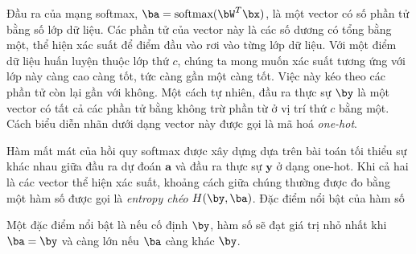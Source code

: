 \def\softmax{\text{softmax}}
Đầu ra của mạng softmax, $\ba = \softmax(\bW^T\bx)$, là một vector có số phần tử bằng số lớp dữ liệu. Các phần tử của vector này là các số dương có tổng bằng một, thể hiện xác suất để điểm đầu vào rơi vào từng lớp dữ liệu. Với một điểm dữ liệu huấn luyện thuộc lớp thứ $c$, chúng ta mong muốn xác suất tương ứng với lớp này càng cao càng tốt, tức càng gần một càng tốt. Việc này kéo theo các phần tử còn lại gần với không. Một cách tự nhiên, đầu ra thực sự $\by$ là một vector có tất cả các phần tử bằng không trừ phần từ ở vị trí thứ $c$ bằng một. Cách biểu diễn nhãn dưới dạng vector này được gọi là mã hoá \textit{one-hot}. 


Hàm mất mát của hồi quy softmax được xây dựng dựa trên bài toán tối thiểu sự
khác nhau giữa {đầu ra dự đoán} $\mathbf{a}$ và {đầu ra thực sự}
$\mathbf{y}$ ở dạng one-hot. Khi cả hai là các vector thể hiện xác suất,
khoảng cách giữa chúng thường được đo bằng một hàm số được gọi là
\textit{entropy chéo} $H(\by, \ba)$. Đặc điểm nổi bật của hàm số 

Một đặc điểm nổi bật là nếu cố định $\by$, hàm số sẽ đạt giá trị nhỏ nhất khi $\ba = \by$ và càng lớn nếu $\ba$ càng khác $\by$.


 
